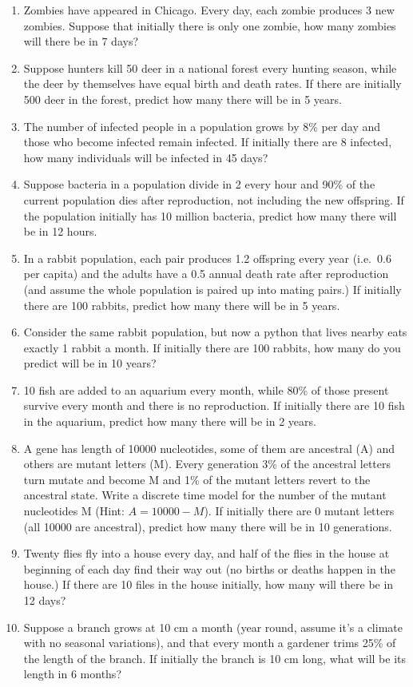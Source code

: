 \documentclass[
  letterpaper,
  DIV=11,
  numbers=noendperiod]{scrreprt}
\begin{document}
\begin{enumerate}
\def\labelenumi{\arabic{enumi}.}
\item
  Zombies have appeared in Chicago. Every day, each zombie produces 3
  new zombies. Suppose that initially there is only one zombie, how many
  zombies will there be in 7 days?
\item
  Suppose hunters kill 50 deer in a national forest every hunting
  season, while the deer by themselves have equal birth and death rates.
  If there are initially 500 deer in the forest, predict how many there
  will be in 5 years.
\item
  The number of infected people in a population grows by 8\% per day and
  those who become infected remain infected. If initially there are 8
  infected, how many individuals will be infected in 45 days?
\item
  Suppose bacteria in a population divide in 2 every hour and 90\% of
  the current population dies after reproduction, not including the new
  offspring. If the population initially has 10 million bacteria,
  predict how many there will be in 12 hours.
\item
  In a rabbit population, each pair produces 1.2 offspring every year
  (i.e.~0.6 per capita) and the adults have a 0.5 annual death rate
  after reproduction (and assume the whole population is paired up into
  mating pairs.) If initially there are 100 rabbits, predict how many
  there will be in 5 years.
\item
  Consider the same rabbit population, but now a python that lives
  nearby eats exactly 1 rabbit a month. If initially there are 100
  rabbits, how many do you predict will be in 10 years?
\item
  10 fish are added to an aquarium every month, while 80\% of those
  present survive every month and there is no reproduction. If initially
  there are 10 fish in the aquarium, predict how many there will be in 2
  years.
\item
  A gene has length of 10000 nucleotides, some of them are ancestral (A)
  and others are mutant letters (M). Every generation 3\% of the
  ancestral letters turn mutate and become M and 1\% of the mutant
  letters revert to the ancestral state. Write a discrete time model for
  the number of the mutant nucleotides M (Hint: \(A = 10000 - M\)). If
  initially there are 0 mutant letters (all 10000 are ancestral),
  predict how many there will be in 10 generations.
\item
  Twenty flies fly into a house every day, and half of the flies in the
  house at beginning of each day find their way out (no births or deaths
  happen in the house.) If there are 10 files in the house initially,
  how many will there be in 12 days?
\item
  Suppose a branch grows at 10 cm a month (year round, assume it's a
  climate with no seasonal variations), and that every month a gardener
  trims 25\% of the length of the branch. If initially the branch is 10
  cm long, what will be its length in 6 months?
\end{enumerate}
\end{document}
